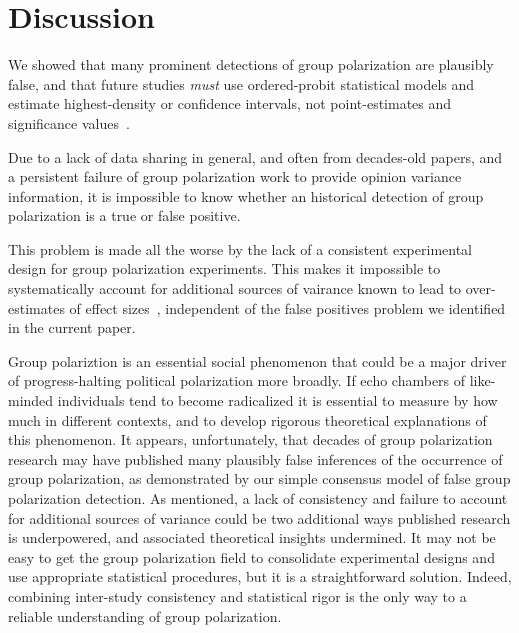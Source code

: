 \documentclass[11pt, letterpaper]{article}
\begin{document}
\section{Discussion}

We showed that many prominent detections of group polarization are plausibly
false, and that future studies \emph{must} use ordered-probit statistical
models and estimate highest-density or confidence intervals, not point-estimates 
and significance values~\cite{Meehl1997}.

Due to a lack of data sharing in general, and often from decades-old papers, and a persistent 
failure of group polarization work to provide opinion variance information, 
it is impossible to know whether an historical detection of group polarization
is a true or false positive. 

This problem is made all the worse by the lack of a consistent experimental design for group
polarization experiments. This makes it impossible to systematically account for
additional sources of vairance known to lead to over-estimates
of effect sizes~\cite{Yarkoni2021}, independent of the false positives problem
we identified in the current paper. 


Group polariztion is an essential social phenomenon that could be a major driver of
progress-halting political polarization more broadly. If echo chambers of like-minded
individuals tend to become radicalized it is essential to measure by how much
in different contexts, and to develop rigorous theoretical explanations of
this phenomenon. It appears, unfortunately, that decades of group polarization
research may have published many plausibly false inferences of the
occurrence of group polarization, as demonstrated by our simple consensus
model of false group polarization detection. As mentioned, a lack of
consistency and failure to account for additional sources of variance could
be two additional ways published research is underpowered, and associated
theoretical insights undermined. It may not be easy to get the group polarization field to 
consolidate experimental designs and use appropriate statistical procedures,
but it is a straightforward solution. Indeed, combining inter-study consistency and statistical
rigor is the only way to a reliable understanding of group polarization.
\end{document}
